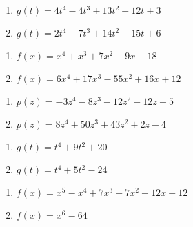 \begin{multicols}{2}
\begin{enumerate}
\setcounter{enumi}{\value{HW}}

\item $g(t) = 4t^{4} - 4t^{3} + 13t^{2} - 12t + 3$
\item $g(t) = 2t^4-7t^3+14t^2-15t+6$

\setcounter{HW}{\value{enumi}}
\end{enumerate}
\end{multicols}

\begin{multicols}{2}
\begin{enumerate}
\setcounter{enumi}{\value{HW}}

\item  $f(x) = x^4+x^3+7x^2+9x-18$
\item  $f(x) = 6x^4+17x^3-55x^2+16x+12$


\setcounter{HW}{\value{enumi}}
\end{enumerate}
\end{multicols}


\begin{multicols}{2}
\begin{enumerate}
\setcounter{enumi}{\value{HW}}

\item  $p(z) = -3z^4-8z^3-12z^2-12z-5$
\item  $p(z) = 8z^4+50z^3+43z^2+2z-4$


\setcounter{HW}{\value{enumi}}
\end{enumerate}
\end{multicols}

\begin{multicols}{2}
\begin{enumerate}
\setcounter{enumi}{\value{HW}}

\item $g(t) = t^4+9t^2+20$
\item $g(t) = t^4 + 5t^2 - 24$

\setcounter{HW}{\value{enumi}}
\end{enumerate}
\end{multicols}

\begin{multicols}{2}
\begin{enumerate}
\setcounter{enumi}{\value{HW}}

\item  $f(x) = x^5 - x^4+7x^3-7x^2+12x-12$
\item $f(x) = x^6-64$


\setcounter{HW}{\value{enumi}}
\end{enumerate}
\end{multicols}



